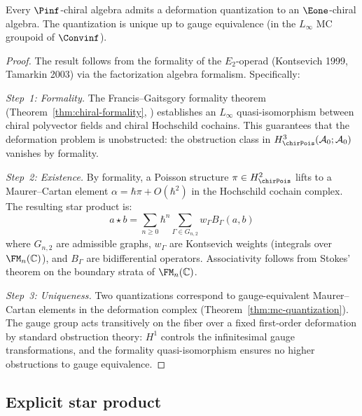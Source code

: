 \begin{theorem}\label{thm:pinf-formality}
Every $\Pinf$-chiral algebra admits a deformation quantization to an $\Eone$-chiral
algebra. The quantization is unique up to gauge equivalence
(in the $L_\infty$ MC groupoid of $\Convinf$).
\end{theorem}

\begin{proof}
The result follows from the formality of the $E_2$-operad (Kontsevich 1999,
Tamarkin 2003) via the factorization algebra formalism. Specifically:

\emph{Step~1: Formality.}
The Francis--Gaitsgory formality theorem
(Theorem~\ref{thm:chiral-formality}, \ClaimStatusProvedElsewhere{} \cite{FG12})
establishes an $L_\infty$ quasi-isomorphism between chiral polyvector
fields and chiral Hochschild cochains. This guarantees that the
deformation problem is unobstructed: the obstruction class in
$H^3_{\chirPois}(\mathcal{A}_0; \mathcal{A}_0)$ vanishes by formality.

\emph{Step~2: Existence.}
By formality, a Poisson structure $\pi \in H^2_{\chirPois}$ lifts to a
Maurer--Cartan element $\alpha = \hbar\pi + O(\hbar^2)$ in the
Hochschild cochain complex. The resulting star product is:
\[
a \star b = \sum_{n \geq 0} \hbar^n \sum_{\Gamma \in G_{n,2}} w_\Gamma B_\Gamma(a, b)
\]
where $G_{n,2}$ are admissible graphs, $w_\Gamma$ are Kontsevich weights
(integrals over $\FM_n(\mathbb{C})$), and $B_\Gamma$ are bidifferential
operators. Associativity follows from Stokes' theorem on the boundary
strata of $\FM_n(\mathbb{C})$.

\emph{Step~3: Uniqueness.}
Two quantizations correspond to gauge-equivalent Maurer--Cartan elements
in the deformation complex (Theorem~\ref{thm:mc-quantization}). The
gauge group acts transitively on the fiber over a fixed first-order
deformation by standard obstruction theory: $H^1$ controls the
infinitesimal gauge transformations, and the formality quasi-isomorphism
ensures no higher obstructions to gauge equivalence.
\end{proof}


\subsection{Explicit star product}


